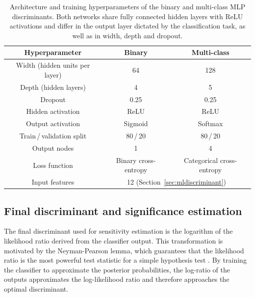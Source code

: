 \begin{table}[htbp]
  \centering
  \caption{Architecture and training hyperparameters of the binary and multi-class MLP discriminants. Both networks share fully connected hidden layers with ReLU activations and differ in the output layer dictated by the classification task, as well as in width, depth and dropout.}
  \label{tab:mlp_hyperparams}
  \begin{tabular}{|c|c|c|}
    \hline
    \textbf{Hyperparameter} & \textbf{Binary} & \textbf{Multi-class} \\
    \hline
    Width (hidden units per layer) & 64 & 128 \\
    Depth (hidden layers)          & 4& 5 \\
    Dropout                        & 0.25& 0.25 \\
    Hidden activation              & ReLU & ReLU \\
    Output activation              & Sigmoid & Softmax \\
    Train\,/\,validation split     & 80\,/\,20 & 80\,/\,20 \\
    Output nodes                   & 1 & 4 \\
    Loss function                  & Binary cross-entropy & Categorical cross-entropy \\
    Input features                 & \multicolumn{2}{c|}{12 (Section~\ref{sec:mldiscriminant})} \\
    \hline
  \end{tabular}
\end{table}

\subsection{Final discriminant and significance estimation}
\label{final_discriminant}
The final discriminant used for sensitivity estimation is the logarithm of the likelihood ratio derived from the classifier output. This transformation is motivated by the Neyman-Pearson lemma, which guarantees that the likelihood ratio is the most powerful test statistic for a simple hypothesis test \cite{Neyman:1933wgr}. By training the classifier to approximate the posterior probabilities, the log-ratio of the outputs approximates the log-likelihood ratio and therefore approaches the optimal discriminant.

